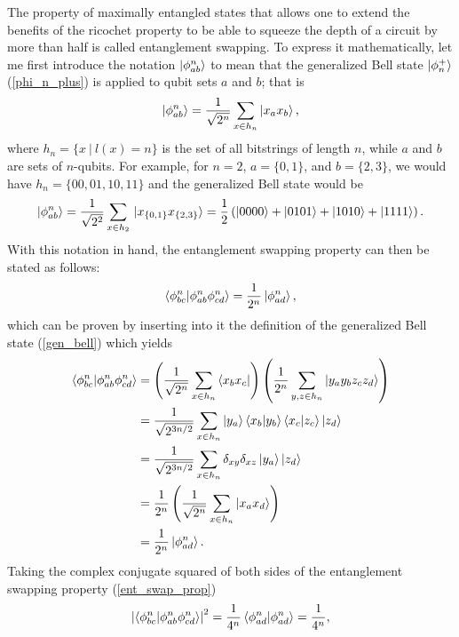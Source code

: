 \documentclass[10pt]{article}
\begin{document}
The property of maximally entangled states that allows one to extend the benefits of the ricochet property to be able to squeeze the depth of a circuit by more than half is called entanglement swapping. To express it mathematically, let me first introduce the notation $\ket{\phi^n_{ab}}$ to mean that the generalized Bell state $\ket{\phi_n^+}$ (\ref{phi_n_plus}) is applied to qubit sets $a$ and $b$; that is
\begin{align}
\label{gen_bell}
\ket{\phi^n_{ab}}=\frac{1}{\sqrt{2^n}}\sum_{x\in h_n}\ket{x_ax_b}
,\end{align}
where $h_n=\{x \ | \ l(x)=n\}$ is the set of all bitstrings of length $n$, while $a$ and $b$ are sets of $n$-qubits. For example, for $n=2$, $a=\{0,1\}$, and $b=\{2,3\}$, we would have $h_n=\{00,01,10,11\}$ and the generalized Bell state would be
\begin{align}
\ket{\phi^n_{ab}}
=
\frac{1}{\sqrt{2^2}}\sum_{x\in h_2}\ket*{x_{\{0,1\}}x_{\{2,3\}}}
=
\frac{1}{2}
\left(
\ket{0000}+\ket{0101}+\ket{1010}+\ket{1111}
\right)
.\end{align}
With this notation in hand, the entanglement swapping property can then be stated as follows:
\begin{align}
\label{ent_swap_prop}
\bra{\phi^n_{bc}}\ket{\phi^n_{ab}\phi^n_{cd}}
=
\frac{1}{2^n}
\ket{\phi^n_{ad}}
,\end{align}
which can be proven by inserting into it the definition of the generalized Bell state (\ref{gen_bell}) which yields
\begin{align}
\bra{\phi^n_{bc}}\ket{\phi^n_{ab}\phi^n_{cd}}
&=
\left(
\frac{1}{\sqrt{2^n}}\sum_{x\in h_n}\bra{x_bx_c}
\right)
\left(
\frac{1}{2^n}\sum_{y,z\in h_n}\ket{y_ay_bz_cz_d}
\right)
\\
&=
\frac{1}{\sqrt{2^{3n/2}}}
\sum_{x\in h_n}
\ket{y_a}\bra{x_b}\ket{y_b}\bra{x_c}\ket{z_c}\ket{z_d}
\nonumber
\\
&=
\frac{1}{\sqrt{2^{3n/2}}}
\sum_{x\in h_n}
\delta_{xy}\delta_{xz}
\ket{y_a}\ket{z_d}
\nonumber
\\
&=
\frac{1}{2^n}
\left(
\frac{1}{\sqrt{2^n}}
\sum_{x\in h_n}
\ket{x_ax_d}
\right)
\nonumber
\\
&=
\frac{1}{2^n}
\ket{\phi^n_{ad}}
.\end{align}
Taking the complex conjugate squared of both sides of the entanglement swapping property (\ref{ent_swap_prop}) 
\begin{align}
\abs{\bra{\phi^n_{bc}}\ket{\phi^n_{ab}\phi^n_{cd}}}^2
=
\frac{1}{4^n}
\bra{\phi^n_{ad}}\ket{\phi^n_{ad}}
=
\frac{1}{4^n}
,\end{align}
\end{document}

